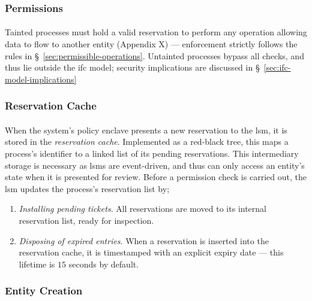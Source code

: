 \subsubsection{Permissions} 
\paragraph{} Tainted processes must hold a valid reservation to perform any operation allowing data to flow to another entity (Appendix X) --- enforcement strictly follows the rules in §~\ref{sec:permissible-operations}. Untainted processes bypass all checks, and thus lie outside the \acrshort{ifc} model; security implications are discussed in §~\ref{sec:ifc-model-implications}


\subsubsection{Reservation Cache} 
\paragraph{} When the system's policy enclave presents a new reservation to the \acrshort{lsm}, it is stored in the \textit{reservation cache}. Implemented as a red-black tree, this maps a process's identifier to a linked list of its pending reservations. This intermediary storage is necessary as \acrshort{lsm}s are event-driven, and thus can only access an entity's state when it is presented for review. Before a permission check is carried out, the \acrshort{lsm} updates the process's reservation list by;
\begin{enumerate}
    \item \textit{Installing pending tickets}. All reservations are moved to its internal reservation list, ready for inspection.
    \item \textit{Disposing of expired entries}. When a reservation is inserted into the reservation cache, it is timestamped with an explicit expiry date --- this lifetime is $15$ seconds by default.  
\end{enumerate}


\subsubsection{Entity Creation}
\label{sec:entity-creation}

